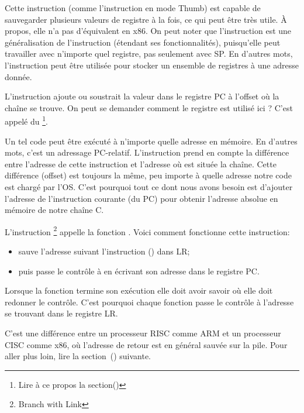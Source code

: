 Cette instruction (comme l'instruction \PUSH en mode Thumb) est capable de
sauvegarder plusieurs valeurs de registre à la fois, ce qui peut être très utile.
À propos, elle n'a pas d'équivalent en x86.
On peut noter que l'instruction  est une généralisation de l'instruction
\PUSH (étendant ses fonctionnalités), puisqu'elle peut travailler avec n'importe
quel registre, pas seulement avec \ac{SP}.
En d'autres mots, l'instruction  peut être utilisée pour stocker un
ensemble de registres à une adresse donnée.

\myindex{\PICcode}
L'instruction 
ajoute ou soustrait la valeur dans le registre \ac{PC} à l'offset où la chaîne
 se trouve.
On peut se demander comment le registre  est utilisé ici ?
C'est appelé du \q{\PICcode}\footnote{Lire à ce propos la section()}.

Un tel code peut être exécuté à n'importe quelle adresse en mémoire.
En d'autres mots, c'est un adressage \ac{PC}-relatif. %
L'instruction  prend en compte la différence entre l'adresse de cette
instruction et l'adresse où est située la chaîne.
Cette différence (offset) est toujours la même, peu importe à quelle adresse
notre code est chargé par l'\ac{OS}.
C'est pourquoi tout ce dont nous avons besoin est d'ajouter l'adresse de l'instruction
courante (du \ac{PC}) pour obtenir l'adresse absolue en mémoire de notre chaîne C.

L'instruction \footnote{Branch with Link} appelle la fonction \printf.
Voici comment fonctionne cette instruction:

\begin{itemize}
\item sauve l'adresse suivant l'instruction  () dans \ac{LR};
\item puis passe le contrôle à \printf en écrivant son adresse dans le registre \ac{PC}.
\end{itemize}

Lorsque la fonction \printf termine son exécution elle doit avoir savoir où elle
doit redonner le contrôle.
C'est pourquoi chaque fonction passe le contrôle à l'adresse se trouvant dans le registre \ac{LR}.

C'est une différence entre un processeur \ac{RISC}  comme ARM et un
processeur \ac{CISC} comme x86, où l'adresse de retour est en général sauvée
sur la pile.
Pour aller plus loin, lire la section~() suivante.

